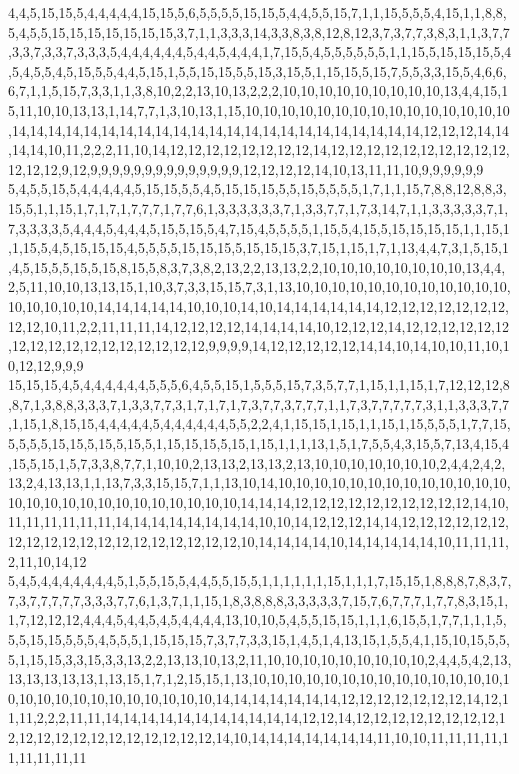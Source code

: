 4,4,5,15,15,5,4,4,4,4,4,15,15,5,6,5,5,5,5,15,15,5,4,4,5,5,15,7,1,1,15,5,5,5,4,15,1,1,8,8,5,4,5,5,15,15,15,15,15,15,15,3,7,1,1,3,3,3,14,3,3,8,3,8,12,8,12,3,7,3,7,7,3,8,3,1,1,3,7,7,3,3,7,3,3,7,3,3,3,5,4,4,4,4,4,4,5,4,4,5,4,4,4,1,7,15,5,4,5,5,5,5,5,5,1,1,15,5,15,15,15,5,4,5,4,5,5,4,5,15,5,5,4,4,5,15,1,5,5,15,15,5,5,15,3,15,5,1,15,15,5,15,7,5,5,3,3,15,5,4,6,6,6,7,1,1,5,15,7,3,3,1,1,3,8,10,2,2,13,10,13,2,2,2,10,10,10,10,10,10,10,10,10,13,4,4,15,15,11,10,10,13,13,1,14,7,7,1,3,10,13,1,15,10,10,10,10,10,10,10,10,10,10,10,10,10,10,10,14,14,14,14,14,14,14,14,14,14,14,14,14,14,14,14,14,14,14,14,14,14,14,12,12,12,14,14,14,14,10,11,2,2,2,11,10,14,12,12,12,12,12,12,12,12,14,12,12,12,12,12,12,12,12,12,12,12,12,12,9,12,9,9,9,9,9,9,9,9,9,9,9,9,9,9,12,12,12,12,14,10,13,11,11,10,9,9,9,9,9,9
5,4,5,5,15,5,4,4,4,4,4,5,15,15,5,5,4,5,15,15,15,5,5,15,5,5,5,5,1,7,1,1,15,7,8,8,12,8,8,3,15,5,1,1,15,1,7,1,7,1,7,7,7,1,7,7,6,1,3,3,3,3,3,3,7,1,3,3,7,7,1,7,3,14,7,1,1,3,3,3,3,3,7,1,7,3,3,3,3,5,4,4,4,5,4,4,4,5,15,5,15,5,4,7,15,4,5,5,5,5,1,15,5,4,15,5,15,15,15,15,1,1,15,1,1,15,5,4,5,15,15,15,4,5,5,5,5,15,15,15,5,15,15,15,3,7,15,1,15,1,7,1,13,4,4,7,3,1,5,15,1,4,5,15,5,5,15,5,15,8,15,5,8,3,7,3,8,2,13,2,2,13,13,2,2,10,10,10,10,10,10,10,10,13,4,4,2,5,11,10,10,13,13,15,1,10,3,7,3,3,15,15,7,3,1,13,10,10,10,10,10,10,10,10,10,10,10,10,10,10,10,10,10,14,14,14,14,14,10,10,10,14,10,14,14,14,14,14,14,12,12,12,12,12,12,12,12,12,10,11,2,2,11,11,11,14,12,12,12,12,14,14,14,14,10,12,12,12,14,12,12,12,12,12,12,12,12,12,12,12,12,12,12,12,12,12,9,9,9,9,14,12,12,12,12,12,14,14,10,14,10,10,11,10,10,12,12,9,9,9
15,15,15,4,5,4,4,4,4,4,4,5,5,5,6,4,5,5,15,1,5,5,5,15,7,3,5,7,7,1,15,1,1,15,1,7,12,12,12,8,8,7,1,3,8,8,3,3,3,7,1,3,3,7,7,3,1,7,1,7,1,7,3,7,7,3,7,7,7,1,1,7,3,7,7,7,7,7,3,1,1,3,3,3,7,7,1,15,1,8,15,15,4,4,4,4,4,5,4,4,4,4,4,4,5,5,2,2,4,1,15,15,1,15,1,1,15,1,15,5,5,5,1,7,7,15,5,5,5,5,15,15,5,15,5,15,5,1,15,15,15,5,15,1,15,1,1,1,13,1,5,1,7,5,5,4,3,15,5,7,13,4,15,4,15,5,15,1,5,7,3,3,8,7,7,1,10,10,2,13,13,2,13,13,2,13,10,10,10,10,10,10,10,2,4,4,2,4,2,13,2,4,13,13,1,1,13,7,3,3,15,15,7,1,1,13,10,14,10,10,10,10,10,10,10,10,10,10,10,10,10,10,10,10,10,10,10,10,10,10,10,10,10,10,14,14,14,12,12,12,12,12,12,12,12,12,12,14,10,11,11,11,11,11,11,14,14,14,14,14,14,14,14,10,10,14,12,12,12,14,14,12,12,12,12,12,12,12,12,12,12,12,12,12,12,12,12,12,12,12,10,14,14,14,14,10,14,14,14,14,14,10,11,11,11,2,11,10,14,12
5,4,5,4,4,4,4,4,4,4,5,1,5,5,15,5,4,4,5,5,15,5,1,1,1,1,1,1,15,1,1,1,7,15,15,1,8,8,8,7,8,3,7,7,3,7,7,7,7,7,3,3,3,7,7,6,1,3,7,1,1,15,1,8,3,8,8,8,3,3,3,3,3,7,15,7,6,7,7,7,1,7,7,8,3,15,1,1,7,12,12,12,4,4,4,5,4,4,5,4,5,4,4,4,4,13,10,10,5,4,5,5,15,15,1,1,1,6,15,5,1,7,7,1,1,1,5,5,5,15,15,5,5,5,4,5,5,5,1,15,15,15,7,3,7,7,3,3,15,1,4,5,1,4,13,15,1,5,5,4,1,15,10,15,5,5,5,1,15,15,3,3,15,3,3,13,2,2,13,13,10,13,2,11,10,10,10,10,10,10,10,10,10,2,4,4,5,4,2,13,13,13,13,13,13,1,13,15,1,7,1,2,15,15,1,13,10,10,10,10,10,10,10,10,10,10,10,10,10,10,10,10,10,10,10,10,10,10,10,10,10,10,14,14,14,14,14,14,14,12,12,12,12,12,12,12,14,12,11,11,2,2,2,11,11,14,14,14,14,14,14,14,14,14,14,14,12,12,14,12,12,12,12,12,12,12,12,12,12,12,12,12,12,12,12,12,12,12,12,14,10,14,14,14,14,14,14,14,11,10,10,11,11,11,11,11,11,11,11,11
